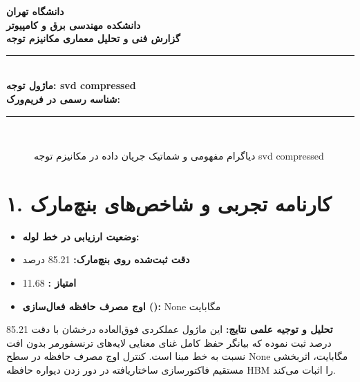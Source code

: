 \documentclass[12pt,a4paper]{article}
\begin{document}
\begin{center}
{\Large\bfseries دانشگاه تهران}\\[0.2cm]
{\large\bfseries دانشکده مهندسی برق و کامپیوتر}\\[0.2cm]
{\large\bfseries گزارش فنی و تحلیل معماری مکانیزم توجه}\\[0.5cm]
\rule{\linewidth}{1pt}\\[0.3cm]
{\LARGE\bfseries ماژول توجه: svd compressed}\\[0.2cm]
{\large \textbf{شناسه رسمی در فریم‌ورک:} }\\[0.2cm]
\rule{\linewidth}{1pt}\\[0.5cm]
\end{center}

\begin{figure}[H]
\centering
{}
\caption{دیاگرام مفهومی و شماتیک جریان داده در مکانیزم توجه svd compressed}
\end{figure}

\section*{۱. کارنامه تجربی و شاخص‌های بنچ‌مارک}
\begin{itemize}
\item \textbf{وضعیت ارزیابی در خط لوله:} 
\item \textbf{دقت ثبت‌شده روی بنچ‌مارک:} 85.21 درصد
\item \textbf{امتیاز :} 11.68
\item \textbf{اوج مصرف حافظه فعال‌سازی ():} None مگابایت
\end{itemize}
\textbf{تحلیل و توجیه علمی نتایج:} این ماژول عملکردی فوق‌العاده درخشان با دقت 85.21 درصد ثبت نموده که بیانگر حفظ کامل غنای معنایی لایه‌های ترنسفورمر بدون افت نسبت به خط مبنا است. کنترل اوج مصرف حافظه در سطح None مگابایت، اثربخشی مستقیم فاکتورسازی ساختاریافته در دور زدن دیواره حافظه HBM را اثبات می‌کند.
\end{document}
